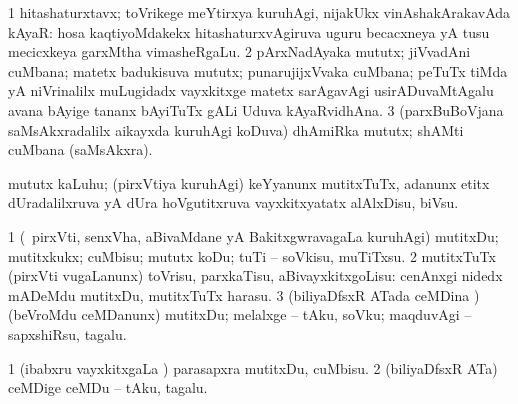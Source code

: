 \noindent
\gl{\pagu}
\bmng
\bnum
\num{1}  hitashaturxtavx; toVrikege meYtirxya kuruhAgi, nijakUkx vinAshakArakavAda kAyaR:  hosa kaqtiyoMdakekx hitashaturxvAgiruva uguru becacxneya yA tusu mecicxkeya garxMtha vimasheRgaLu. 
\num{2}  pArxNadAyaka mututx; jiVvadAni cuMbana; matetx badukisuva mututx; punarujijxVvaka cuMbana; peTuTx tiMda yA niVrinalilx muLugidadx vayxkitxge matetx sarAgavAgi usirADuvaMtAgalu avana bAyige tananx bAyiTuTx gALi Uduva kAyaRvidhAna. 
\num{3}  (parxBuBoVjana saMsAkxradalilx aikayxda kuruhAgi koDuva) dhAmiRka mututx; shAMti cuMbana (saMsAkxra). 
\enum
\emng

\noindent
\hypertarget{kiss(1)nuga}{}
\gl{\nuga}
\bmng
{} mututx kaLuhu; (pirxVtiya kuruhAgi) keYyanunx mutitxTuTx, adanunx etitx dUradalilxruva yA dUra hoVgutitxruva vayxkitxyatatx alAlxDisu, biVsu. 
\emng
\eentry

\bentry
{}
\gl{\sakirx}
\bmng
\bnum
\num{1} (\kanmu\ pirxVti, senxVha, aBivaMdane yA BakitxgwravagaLa kuruhAgi) mutitxDu; mutitxkukx; cuMbisu; mututx koDu; tuTi -- soVkisu, muTiTxsu. 
\num{2} mutitxTuTx (pirxVti \mo vugaLanunx) toVrisu, parxkaTisu, aBivayxkitxgoLisu:  cenAnxgi nidedx mADeMdu mutitxDu, mutitxTuTx harasu. 
\num{3} (biliyaDfsxR ATada ceMDina \vi) (beVroMdu ceMDanunx) mutitxDu; melalxge -- tAku, soVku; maqduvAgi -- sapxshiRsu, tagalu. 
\enum
\emng

\noindent
\gl{\akirx}
\bmng
\bnum
\num{1} (ibabxru vayxkitxgaLa \vi) parasapxra mutitxDu, cuMbisu. 
\num{2} (biliyaDfsxR ATa) ceMDige ceMDu -- tAku, tagalu. 
\enum
\emng

